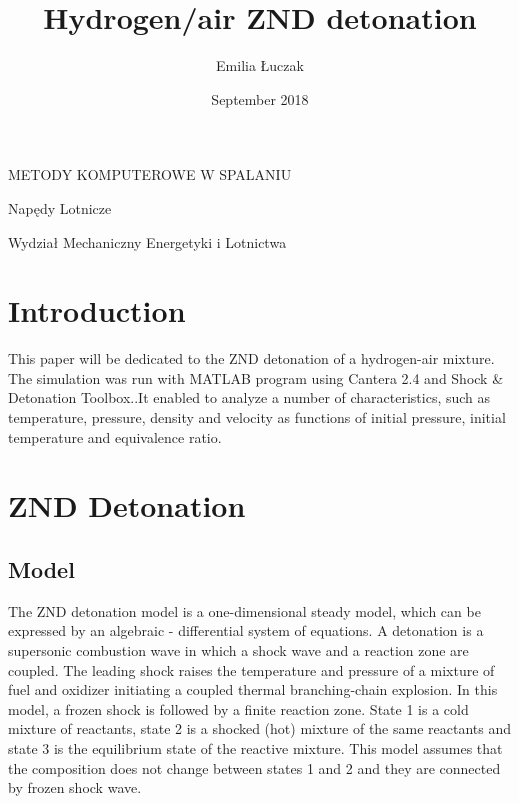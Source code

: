\documentclass[a4paper]{article}
\title{Hydrogen/air ZND detonation}
\author{Emilia Łuczak}
\date{September 2018}
\newcommand{\sepspace}{\vspace*{1em}}
\begin{document}
\maketitle
\sepspace
 \begin{centering}
 METODY KOMPUTEROWE W SPALANIU\\
 \end{centering}
 \sepspace
 \sepspace
 \sepspace
 \sepspace
 \sepspace
 \sepspace
 \sepspace
 \sepspace
 \sepspace
 \sepspace
 \sepspace
 \sepspace
 \sepspace
 \sepspace
 \sepspace
 \sepspace
 \sepspace
 \sepspace
 \sepspace
 \sepspace
 \sepspace
 \sepspace
 \sepspace
 \sepspace
 \sepspace
 \sepspace
 \sepspace
 \sepspace
 \sepspace
 \sepspace
 \sepspace
 \sepspace
 \sepspace
 \sepspace
 \sepspace
 \sepspace
 \sepspace
 \sepspace
 \sepspace
 \sepspace
 \sepspace
 \sepspace
 \sepspace
 \sepspace
 \sepspace
 
 
 \begin{centering}
 Napędy Lotnicze\\
 \end{centering}
 \begin{centering}
 Wydział Mechaniczny Energetyki i Lotnictwa\\
 \end{centering}


\pagebreak
\section{Introduction}

This paper will be dedicated to the ZND detonation of a hydrogen-air mixture. The simulation was run with MATLAB program using Cantera 2.4 and Shock \& Detonation Toolbox..It enabled to analyze a number of characteristics, such as temperature, pressure, density and velocity as functions of initial pressure, initial temperature and equivalence ratio.

\sepspace
\sepspace
\section{ZND Detonation}

\subsection{Model}

The ZND detonation model is a one-dimensional steady model, which can be expressed by an algebraic - differential system of equations. A detonation is a supersonic combustion wave in which a shock wave and a reaction zone are coupled. The leading shock raises the temperature and pressure of a mixture of fuel and oxidizer initiating a coupled thermal branching-chain explosion. In this model, a frozen shock is followed by a finite reaction zone. State 1 is a cold mixture of reactants, state 2 is a shocked (hot) mixture of the same reactants and state 3 is the equilibrium state of the reactive mixture. This model assumes that the composition does not change between states 1 and 2 and they are connected by frozen shock wave. \\
\end{document}
